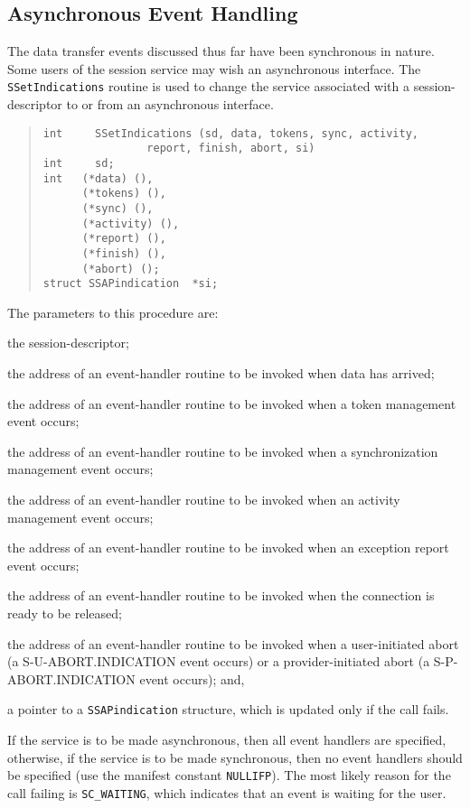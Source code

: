 \subsection	{Asynchronous Event Handling}
The data transfer events discussed thus far have been synchronous in nature.
Some users of the session service may wish an asynchronous interface.
The \verb"SSetIndications" routine is used to change the service associated
with a session-descriptor to or from an asynchronous interface.
\begin{quote}\small\begin{verbatim}
int     SSetIndications (sd, data, tokens, sync, activity,
                report, finish, abort, si)
int     sd;
int   (*data) (),
      (*tokens) (),
      (*sync) (),
      (*activity) (),
      (*report) (),
      (*finish) (),
      (*abort) ();
struct SSAPindication  *si;
\end{verbatim}\end{quote}
The parameters to this procedure are:
\begin{describe}
\item[\verb"sd":] the session-descriptor;

\item[\verb"data":] the address of an event-handler routine to be invoked when
data has arrived;

\item[\verb"tokens":] the address of an event-handler routine to be invoked
when a token management event occurs;

\item[\verb"sync":] the address of an event-handler routine to be invoked
when a synchronization management event occurs;

\item[\verb"activity":] the address of an event-handler routine to be invoked
when an activity management event occurs;

\item[\verb"report":] the address of an event-handler routine to be invoked
when an exception report event occurs;

\item[\verb"finish":] the address of an event-handler routine to be invoked
when the connection is ready to be released;

\item[\verb"abort":] the address of an event-handler routine to be invoked when
a user-initiated abort (a {\sf S-U-ABORT.INDICATION\/} event occurs)
or a provider-initiated abort
(a {\sf S-P-ABORT.INDICATION\/} event occurs);
and,

\item[\verb"si":] a pointer to a \verb"SSAPindication" structure, which is updated
only if the call fails.
\end{describe}
If the service is to be made asynchronous,
then all event handlers are specified,
otherwise,
if the service is to be made synchronous,
then no event handlers should be specified
(use the manifest constant \verb"NULLIFP").
The most likely reason for the call failing is \verb"SC_WAITING",
which indicates that an event is waiting for the user.

